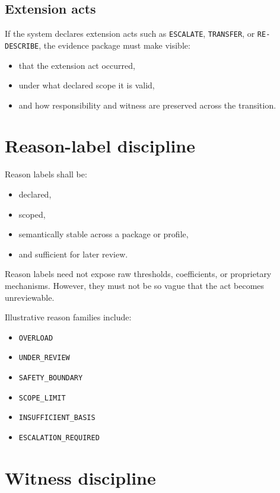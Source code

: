 \documentclass[11pt]{article}
\begin{document}
\subsection{Extension acts}

If the system declares extension acts such as \texttt{ESCALATE}, \texttt{TRANSFER}, or \texttt{RE-DESCRIBE}, the evidence package must make visible:
\begin{itemize}[leftmargin=2em]
    \item that the extension act occurred,
    \item under what declared scope it is valid,
    \item and how responsibility and witness are preserved across the transition.
\end{itemize}

\section{Reason-label discipline}

Reason labels shall be:
\begin{itemize}[leftmargin=2em]
    \item declared,
    \item scoped,
    \item semantically stable across a package or profile,
    \item and sufficient for later review.
\end{itemize}

Reason labels need not expose raw thresholds, coefficients, or proprietary mechanisms. However, they must not be so vague that the act becomes unreviewable.

Illustrative reason families include:
\begin{itemize}[leftmargin=2em]
    \item \texttt{OVERLOAD}
    \item \texttt{UNDER\_REVIEW}
    \item \texttt{SAFETY\_BOUNDARY}
    \item \texttt{SCOPE\_LIMIT}
    \item \texttt{INSUFFICIENT\_BASIS}
    \item \texttt{ESCALATION\_REQUIRED}
\end{itemize}

\section{Witness discipline}
\end{document}
